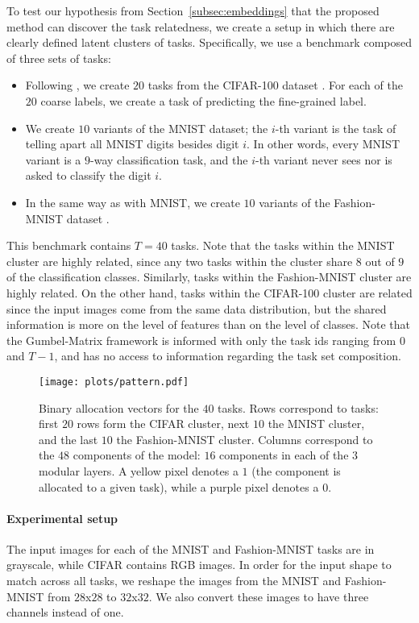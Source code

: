 \documentclass[conference]{IEEEtran}
\begin{document}
To test our hypothesis from Section~\ref{subsec:embeddings} that the proposed method can discover the task relatedness, we create a setup in which there are clearly defined latent clusters of tasks.
Specifically, we use a benchmark composed of three sets of tasks:
\begin{itemize}
    \item Following \cite{RoutingNetworks18}, we create $20$ tasks from the CIFAR-100 dataset \cite{krizhevsky2009learning}. For each of the $20$ coarse labels, we create a task of predicting the fine-grained label.
    \item We create $10$ variants of the MNIST dataset; the $i$-th variant is the task of telling apart all MNIST digits besides digit $i$. In other words, every MNIST variant is a $9$-way classification task, and the $i$-th variant never sees nor is asked to classify the digit $i$.
    \item In the same way as with MNIST, we create $10$ variants of the Fashion-MNIST dataset \cite{xiao2017fashion}.
\end{itemize}

This benchmark contains $T = 40$ tasks. Note that the tasks within the MNIST cluster are highly related, since any two tasks within the cluster share $8$ out of $9$ of the classification classes. Similarly, tasks within the Fashion-MNIST cluster are highly related. On the other hand, tasks within the CIFAR-100 cluster are related since the input images come from the same data distribution, but the shared information is more on the level of features than on the level of classes. 
Note that the Gumbel-Matrix framework is informed with only the task ids ranging from $0$ and $T-1$, and has no access to information regarding the task set composition.

\begin{figure}[t]
\begin{center}
\texttt{[image: plots/pattern.pdf]}
\end{center}
\caption{Binary allocation vectors for the $40$ tasks. Rows correspond to tasks: first $20$ rows form the CIFAR cluster, next $10$ the MNIST cluster, and the last $10$ the Fashion-MNIST cluster. Columns correspond to the $48$ components of the model: $16$ components in each of the $3$ modular layers. A yellow pixel denotes a $1$ (the component is allocated to a given task), while a purple pixel denotes a $0$.}\label{fig:pattern}
\end{figure}

\paragraph{Experimental setup}
The input images for each of the MNIST and Fashion-MNIST tasks are in grayscale, while CIFAR contains RGB images.
In order for the input shape to match across all tasks, we reshape the images from the MNIST and Fashion-MNIST  from $28$x$28$ to $32$x$32$. We also convert these images to have three channels instead of one.
\end{document}
